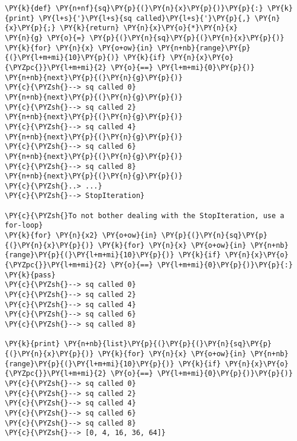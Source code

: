 \begin{Verbatim}[commandchars=\\\{\}]
\PY{k}{def} \PY{n+nf}{sq}\PY{p}{(}\PY{n}{x}\PY{p}{)}\PY{p}{:} \PY{k}{print} \PY{l+s}{'}\PY{l+s}{sq called}\PY{l+s}{'}\PY{p}{,} \PY{n}{x}\PY{p}{;} \PY{k}{return} \PY{n}{x}\PY{o}{*}\PY{n}{x}
\PY{n}{g} \PY{o}{=} \PY{p}{(}\PY{n}{sq}\PY{p}{(}\PY{n}{x}\PY{p}{)} \PY{k}{for} \PY{n}{x} \PY{o+ow}{in} \PY{n+nb}{range}\PY{p}{(}\PY{l+m+mi}{10}\PY{p}{)} \PY{k}{if} \PY{n}{x}\PY{o}{\PYZpc{}}\PY{l+m+mi}{2} \PY{o}{==} \PY{l+m+mi}{0}\PY{p}{)}
\PY{n+nb}{next}\PY{p}{(}\PY{n}{g}\PY{p}{)}
\PY{c}{\PYZsh{}--> sq called 0}
\PY{n+nb}{next}\PY{p}{(}\PY{n}{g}\PY{p}{)}
\PY{c}{\PYZsh{}--> sq called 2}
\PY{n+nb}{next}\PY{p}{(}\PY{n}{g}\PY{p}{)}
\PY{c}{\PYZsh{}--> sq called 4}
\PY{n+nb}{next}\PY{p}{(}\PY{n}{g}\PY{p}{)}
\PY{c}{\PYZsh{}--> sq called 6}
\PY{n+nb}{next}\PY{p}{(}\PY{n}{g}\PY{p}{)}
\PY{c}{\PYZsh{}--> sq called 8}
\PY{n+nb}{next}\PY{p}{(}\PY{n}{g}\PY{p}{)}
\PY{c}{\PYZsh{}..> ...}
\PY{c}{\PYZsh{}--> StopIteration}

\PY{c}{\PYZsh{}To not bother dealing with the StopIteration, use a for-loop}
\PY{k}{for} \PY{n}{x2} \PY{o+ow}{in} \PY{p}{(}\PY{n}{sq}\PY{p}{(}\PY{n}{x}\PY{p}{)} \PY{k}{for} \PY{n}{x} \PY{o+ow}{in} \PY{n+nb}{range}\PY{p}{(}\PY{l+m+mi}{10}\PY{p}{)} \PY{k}{if} \PY{n}{x}\PY{o}{\PYZpc{}}\PY{l+m+mi}{2} \PY{o}{==} \PY{l+m+mi}{0}\PY{p}{)}\PY{p}{:} \PY{k}{pass}
\PY{c}{\PYZsh{}--> sq called 0}
\PY{c}{\PYZsh{}--> sq called 2}
\PY{c}{\PYZsh{}--> sq called 4}
\PY{c}{\PYZsh{}--> sq called 6}
\PY{c}{\PYZsh{}--> sq called 8}

\PY{k}{print} \PY{n+nb}{list}\PY{p}{(}\PY{p}{(}\PY{n}{sq}\PY{p}{(}\PY{n}{x}\PY{p}{)} \PY{k}{for} \PY{n}{x} \PY{o+ow}{in} \PY{n+nb}{range}\PY{p}{(}\PY{l+m+mi}{10}\PY{p}{)} \PY{k}{if} \PY{n}{x}\PY{o}{\PYZpc{}}\PY{l+m+mi}{2} \PY{o}{==} \PY{l+m+mi}{0}\PY{p}{)}\PY{p}{)}
\PY{c}{\PYZsh{}--> sq called 0}
\PY{c}{\PYZsh{}--> sq called 2}
\PY{c}{\PYZsh{}--> sq called 4}
\PY{c}{\PYZsh{}--> sq called 6}
\PY{c}{\PYZsh{}--> sq called 8}
\PY{c}{\PYZsh{}--> [0, 4, 16, 36, 64]}
\end{Verbatim}
